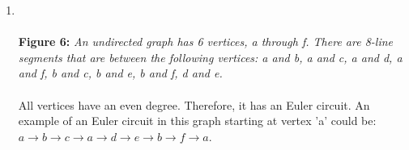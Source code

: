 \documentclass{amsart}
\theoremstyle{definition}
\theoremstyle{Exercise}
\theoremstyle{remark}
\theoremstyle{rule}
\numberwithin{equation}{section}
\begin{document}
	\begin{enumerate}[label=(\alph{*})]
		\item {} \\\\
			{\color{blue} {\bf Figure 6:} \emph{An undirected graph has 6 vertices, a through f. There are 8-line segments that are between the following vertices: a and b, a and c, a and d, a and f, b and c, b and e, b and f, d and e. } }\\\\
			All vertices have an even degree. Therefore, it has an Euler circuit. An example
			of an Euler circuit in this graph starting at vertex 'a' could be:
			$a \rightarrow b \rightarrow c \rightarrow a \rightarrow d \rightarrow e \rightarrow
			b \rightarrow f \rightarrow a$. \\\\
			\newpage
			~\\~\\


\end{enumerate}
\end{document}
